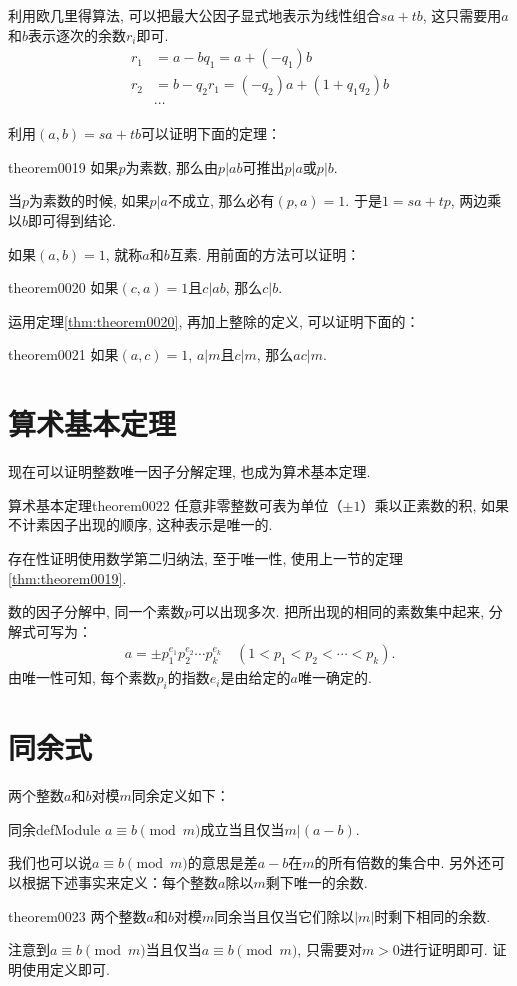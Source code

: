 利用欧几里得算法, 可以把最大公因子显式地表示为线性组合$sa+tb$, 这只需要用$a$和$b$表示逐次的余数$r_i$即可. 
\[
\begin{aligned}
r_1 &= a - bq_1 = a + (-q_1)b \\
r_2 &= b - q_2r_1 = (-q_2)a + (1 + q_1q_2)b \\
&\cdots
\end{aligned}
\]

利用$(a, b) = sa+tb$可以证明下面的定理：
\begin{theorem}{}{theorem0019}
如果$p$为素数, 那么由$p|ab$可推出$p|a$或$p|b$. 
\end{theorem}

当$p$为素数的时候, 如果$p|a$不成立, 那么必有$(p, a)=1$. 于是$1 = sa+tp$, 两边乘以$b$即可得到结论. 

如果$(a, b)=1$, 就称$a$和$b$互素. 用前面的方法可以证明：
\begin{theorem}{}{theorem0020}
如果$(c, a)=1$且$c|ab$, 那么$c|b$. 
\end{theorem}

运用定理\ref{thm:theorem0020}, 再加上整除的定义, 可以证明下面的：
\begin{theorem}{}{theorem0021}
如果$(a, c)=1$, $a|m$且$c|m$, 那么$ac|m$. 
\end{theorem}


\section{算术基本定理}\label{section0010108}
现在可以证明整数唯一因子分解定理, 也成为算术基本定理. 
\begin{theorem}{算术基本定理}{theorem0022}
任意非零整数可表为单位（$\pm{}1$）乘以正素数的积, 如果不计素因子出现的顺序, 这种表示是唯一的. 
\end{theorem}

存在性证明使用数学第二归纳法, 至于唯一性, 使用上一节的定理\ref{thm:theorem0019}. 

数的因子分解中, 同一个素数$p$可以出现多次. 把所出现的相同的素数集中起来, 分解式可写为：
\begin{gather}\label{equation0015}
a = \pm{}p_1^{e_1}p_2^{e_2} \cdots p_k^{e_k} \quad (1 < p_1 < p_2 < \cdots < p_k).
\end{gather}
由唯一性可知, 每个素数$p_i$的指数$e_i$是由给定的$a$唯一确定的. 


\section{同余式}\label{section0010109}
两个整数$a$和$b$对模$m$同余定义如下：
\begin{definition}{同余}{defModule}
$a \equiv b \pmod{m}$成立当且仅当$m|(a-b)$. 
\end{definition}
我们也可以说$a \equiv b \pmod{m}$的意思是差$a-b$在$m$的所有倍数的集合中. 另外还可以根据下述事实来定义：每个整数$a$除以$m$剩下唯一的余数. 
\begin{theorem}{}{theorem0023}
两个整数$a$和$b$对模$m$同余当且仅当它们除以$|m|$时剩下相同的余数. 
\end{theorem}
注意到$a \equiv b \pmod{m}$当且仅当$a \equiv b \pmod{m}$, 只需要对$m>0$进行证明即可. 证明使用定义即可. 

